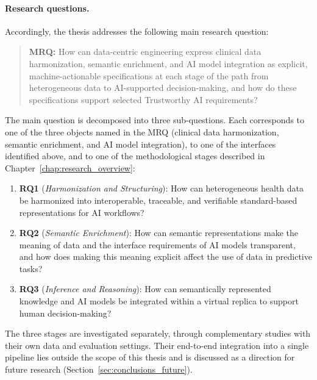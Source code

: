 \paragraph{Research questions.}
Accordingly, the thesis addresses the following main research question:

\begin{quote}
\textbf{MRQ:} How can data-centric engineering express clinical data harmonization, semantic enrichment, and AI model integration as explicit, machine-actionable specifications at each stage of the path from heterogeneous data to AI-supported decision-making, and how do these specifications support selected Trustworthy AI requirements?
\end{quote}

\noindent The main question is decomposed into three sub-questions. Each corresponds to one of the three objects named in the MRQ (clinical data harmonization, semantic enrichment, and AI model integration), to one of the interfaces identified above, and to one of the methodological stages described in Chapter~\ref{chap:research_overview}:

\begin{enumerate}

\item \textbf{RQ1} (\emph{Harmonization and Structuring}): How can heterogeneous health data be harmonized into interoperable, traceable, and verifiable standard-based representations for AI workflows?

\item \textbf{RQ2} (\emph{Semantic Enrichment}): How can semantic representations make the meaning of data and the interface requirements of AI models transparent, and how does making this meaning explicit affect the use of data in predictive tasks?

\item \textbf{RQ3} (\emph{Inference and Reasoning}): How can semantically represented knowledge and AI models be integrated within a virtual replica to support human decision-making?

\end{enumerate}

\noindent The three stages are investigated separately, through complementary studies with their own data and evaluation settings. Their end-to-end integration into a single pipeline lies outside the scope of this thesis and is discussed as a direction for future research (Section~\ref{sec:conclusions_future}).

